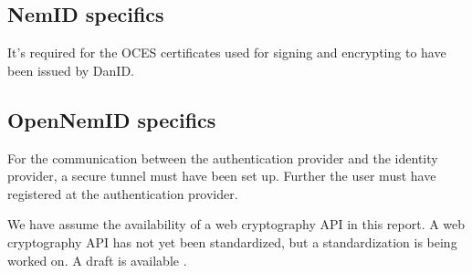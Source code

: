 \documentclass[twosided]{report}
\begin{document}
\subsection{NemID specifics}
It's required for the OCES certificates used for signing and encrypting to have been issued by DanID.

\subsection{OpenNemID specifics}
For the communication between the authentication provider and the identity provider, a secure tunnel must have been set up. Further the user must have registered at the authentication provider.
\par
We have assume the availability of a web cryptography API in this report. A web cryptography API has not yet been standardized, but a standardization is being worked on. A draft is available \cite{webcrypto}. 
\end{document}
